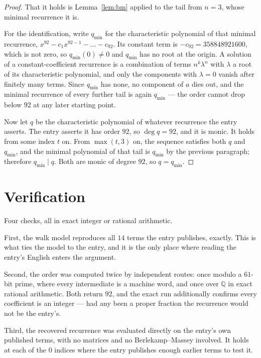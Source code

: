 \documentclass[11pt,a4paper]{article}
\theoremstyle{plain}
\theoremstyle{definition}
\begin{document}
\begin{proof}
That it holds is Lemma~\ref{lem:bm} applied to the tail from $n=3$, whose minimal
recurrence it is.

For the identification, write $q_{\min}$ for the characteristic polynomial of that minimal
recurrence, $x^{92}-c_1x^{92-1}-\dots-c_{92}$. Its constant term is
$-c_{92}=358848921600$, which is not zero, so $q_{\min}(0)\neq0$ and $q_{\min}$ has no
root at the origin. A solution of a constant-coefficient recurrence is a combination of terms
$n^{k}\lambda^{n}$ with $\lambda$ a root of its characteristic polynomial, and only the
components with $\lambda=0$ vanish after finitely many terms. Since $q_{\min}$ has none, no
component of $a$ dies out, and the minimal recurrence of every further tail is again
$q_{\min}$ --- the order cannot drop below $92$ at any later starting point.

Now let $q$ be the characteristic polynomial of whatever recurrence the entry asserts. The
entry asserts it has order $92$, so $\deg q=92$, and it is monic. It holds from some
index $t$ on. From $\max(t,3)$ on, the sequence satisfies both $q$ and $q_{\min}$, and
the minimal polynomial of that tail is $q_{\min}$ by the previous paragraph; therefore
$q_{\min}\mid q$. Both are monic of degree $92$, so $q=q_{\min}$.
\end{proof}

\section{Verification}

Four checks, all in exact integer or rational arithmetic.

First, the walk model reproduces all $14$ terms the entry publishes, exactly. This is
what ties the model to the entry, and it is the only place where reading the entry's English
enters the argument.

Second, the order was computed twice by independent routes: once modulo a $61$-bit prime, where
every intermediate is a machine word, and once over $\mathbb{Q}$ in exact rational arithmetic.
Both return $92$, and the exact run additionally confirms every coefficient is an integer
--- had any been a proper fraction the recurrence would not be the entry's.

Third, the recovered recurrence was evaluated directly on the entry's own published terms, with
no matrices and no Berlekamp--Massey involved. It holds at each of the $0$ indices where
the entry publishes enough earlier terms to test it.
\end{document}
